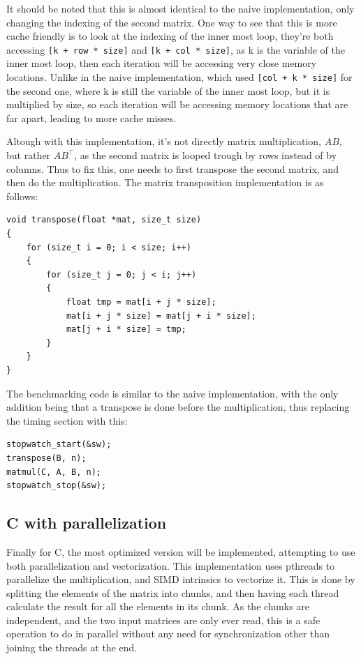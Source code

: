 \documentclass{article}
\begin{document}
It should be noted that this is almost identical to the naive implementation,
only changing the indexing of the second matrix.
One way to see that this is more cache friendly is to look at the indexing of the inner most loop,
they're both accessing \texttt{[k + row * size]} and \texttt{[k + col * size]},
as k is the variable of the inner most loop, then each iteration will be accessing very close memory locations.
Unlike in the naive implementation, which used \texttt{[col + k * size]} for the second one,
where k is still the variable of the inner most loop, but it is multiplied by size, so each iteration will be accessing
memory locations that are far apart, leading to more cache misses.

Altough with this implementation, it's not directly matrix multiplication, $AB$,
but rather $AB^\top$, as the second matrix is looped trough by rows instead of by columns.
Thus to fix this, one needs to first transpose the second matrix, and then do the multiplication.
The matrix transposition implementation is as follows:

\begin{verbatim}
void transpose(float *mat, size_t size)
{
	for (size_t i = 0; i < size; i++)
	{
		for (size_t j = 0; j < i; j++)
		{
			float tmp = mat[i + j * size];
			mat[i + j * size] = mat[j + i * size];
			mat[j + i * size] = tmp;
		}
	}
}
\end{verbatim}

The benchmarking code is similar to the naive implementation, with the only addition being that
a transpose is done before the multiplication, thus replacing the timing section with this:

\begin{verbatim}
stopwatch_start(&sw);
transpose(B, n);
matmul(C, A, B, n);
stopwatch_stop(&sw);
\end{verbatim}

\subsection{C with parallelization}

Finally for C, the most optimized version will be implemented, attempting to use both parallelization and vectorization.
This implementation uses pthreads to parallelize the multiplication, and SIMD intrinsics to vectorize it.
This is done by splitting the elements of the matrix into chunks, and then having each thread calculate the result for all the elements in its chunk.
As the chunks are independent, and the two input matrices are only ever read, this is a safe operation to do in parallel without any need for synchronization other than joining
the threads at the end.
\end{document}
